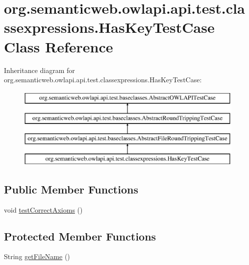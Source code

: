 \hypertarget{classorg_1_1semanticweb_1_1owlapi_1_1api_1_1test_1_1classexpressions_1_1_has_key_test_case}{\section{org.\-semanticweb.\-owlapi.\-api.\-test.\-classexpressions.\-Has\-Key\-Test\-Case Class Reference}
\label{classorg_1_1semanticweb_1_1owlapi_1_1api_1_1test_1_1classexpressions_1_1_has_key_test_case}
}
Inheritance diagram for org.\-semanticweb.\-owlapi.\-api.\-test.\-classexpressions.\-Has\-Key\-Test\-Case\-:\begin{figure}[H]
\begin{center}
\leavevmode
\includegraphics[height=4.000000cm]{classorg_1_1semanticweb_1_1owlapi_1_1api_1_1test_1_1classexpressions_1_1_has_key_test_case}
\end{center}
\end{figure}
\subsection*{Public Member Functions}
\begin{DoxyCompactItemize}
\item 
void \hyperlink{classorg_1_1semanticweb_1_1owlapi_1_1api_1_1test_1_1classexpressions_1_1_has_key_test_case_a4857cd503ed2c312f83072c5c2302718}{test\-Correct\-Axioms} ()
\end{DoxyCompactItemize}
\subsection*{Protected Member Functions}
\begin{DoxyCompactItemize}
\item 
String \hyperlink{classorg_1_1semanticweb_1_1owlapi_1_1api_1_1test_1_1classexpressions_1_1_has_key_test_case_a005702437e9429992902c7fbe8d88a9d}{get\-File\-Name} ()
\end{DoxyCompactItemize}


